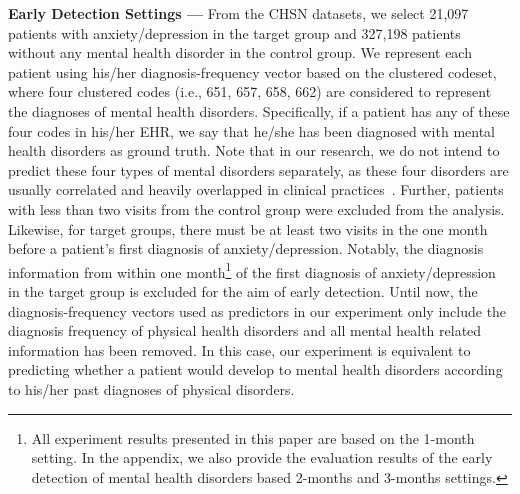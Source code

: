 \textbf{Early Detection Settings --- } From the CHSN datasets, we select 21,097 patients with anxiety/depression in the target group and 327,198 patients without any mental health disorder in the control group. 
%
%
We represent each patient using his/her diagnosis-frequency vector based on the clustered codeset, where four clustered codes (i.e., 651, 657, 658, 662) are considered to represent the diagnoses of mental health disorders. 
%
%
Specifically, if a patient has any of these four codes in his/her EHR, we say that he/she has been diagnosed with mental health disorders as ground truth.
Note that in our research, we do not intend to predict these four types of mental disorders separately, as these four disorders are usually correlated and heavily overlapped in clinical practices~\cite{kendler2003life}.
Further, patients with less than two visits from the control group were excluded from the analysis.
Likewise, for target groups, there must be at least two visits in the one month before a patient's first diagnosis of anxiety/depression.
Notably, the diagnosis information from within one month\footnote{All experiment results presented in this paper are based on the 1-month setting.
In the appendix, we also provide the evaluation results of the early detection of mental health disorders based 2-months and 3-months settings.} of the first diagnosis of anxiety/depression in the target group is excluded for the aim of early detection.
Until now, the diagnosis-frequency vectors used as predictors in our experiment only include the diagnosis frequency of physical health disorders and all mental health related information has been removed.
In this case, our experiment is equivalent to predicting whether a patient would develop to mental health disorders according to his/her past diagnoses of physical disorders.




